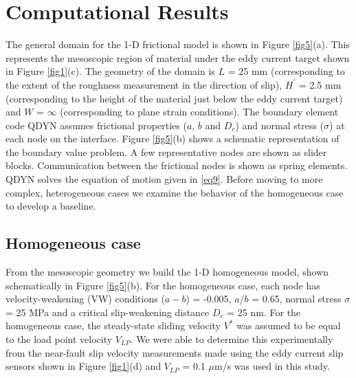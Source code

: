 \documentclass[preprint,1p, 10pt,authoryear]{elsarticle}
\begin{document}
\section{Computational Results}

The general domain for the 1-D frictional model is shown in Figure \ref{fig5}(a). This represents the mesoscopic region of material under the eddy current target shown in Figure \ref{fig1}(c). The geometry of the domain is $L$ = 25 mm (corresponding to the extent of the roughness measurement in the direction of slip), $H^{'}$ = 2.5 mm (corresponding to the height of the material just below the eddy current target) and $W$ = $\infty$ (corresponding to plane strain conditions). The boundary element code QDYN assumes frictional properties ($a$, $b$ and $D_{c}$) and normal stress ($\sigma$) at each node on the interface. Figure \ref{fig5}(b) shows a schematic representation of the boundary value problem. A few representative nodes are shown as slider blocks. Communication between the frictional nodes is shown as spring elements. QDYN  solves the equation of motion given in \eqref{eq9}. Before moving to more complex, heterogeneous cases we examine the behavior of the homogeneous case to develop a baseline.    

\subsection{Homogeneous case}
From the mesoscopic geometry we build the 1-D homogeneous model, shown schematically in Figure \ref{fig5}(b). For the homogeneous case, each node has velocity-weakening (VW) conditions ($a-b$) = -0.005, $a/b$ = 0.65, normal stress $\sigma$ = 25 MPa and a critical slip-weakening distance $D_{c}$ = 25 nm. For the homogeneous case, the steady-state sliding velocity $V^{*}$ was assumed to be equal to the load point velocity $V_{LP}$. We were able to determine this experimentally from the near-fault slip velocity measurements made using the eddy current slip sensors shown in Figure \ref{fig1}(d) and  $V_{LP}$ = 0.1 $\mu$m/s  was used in this study.
\end{document}
